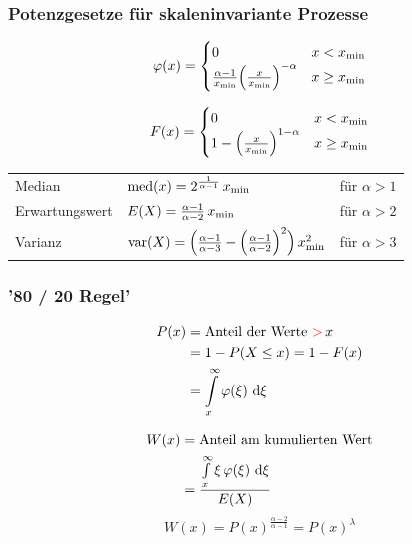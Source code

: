 \subsubsection{Potenzgesetze für skaleninvariante Prozesse}

$$ \varphi(x) = \begin{cases}
0 																			& x < x_{\rm min} 	\\
\frac{\alpha - 1}{x_{\rm min}} \Big( \frac{x}{x_{\rm min}} \Big)^{-\alpha} 	& x \geq x_{\rm min} 
\end{cases}$$ 



$$ F(x) =  \begin{cases}
0 													& x < x_{\rm min} 		\\
1 - \Big( \frac{x}{x_{\rm min}} \Big)^{1 - \alpha} 	& x \geq x_{\rm min} 
\end{cases}$$ 

\vspace{0.2cm}

\renewcommand{\arraystretch}{1.4}
\begin{tabular}{lll}
	Median 			& $ \mathrm{med}(x) = 2^{\frac{1}{\alpha-1}} \, x_{\rm min} $ 	& für $\alpha > 1$ \\
	Erwartungswert 	& $E(X) = \frac{\alpha - 1}{\alpha - 2} \, x_{\rm min}$ 		& für $\alpha > 2$ \\
	Varianz 		& $ \mathrm{var}(X) = \Big( \frac{\alpha - 1}{\alpha - 3} - \Big( \frac{\alpha - 1}{\alpha - 2} \Big)^2 \Big) \, x_{\rm min}^2 $ & für $\alpha > 3$
\end{tabular}
\renewcommand{\arraystretch}{1}


\subsubsection{'80 / 20 Regel'}

\vspace{-0.4cm}

\begin{minipage}[t]{0.48\columnwidth}
	\begin{align*}
		P(x) 	&= \text{Anteil der Werte } {\color{red}>} \, x 			\\
				&= 1 - P(X \leq x) = 1 - F(x) 						\\
				&= \int\limits_x^{\infty} \varphi(\xi) \, \mathop{} \! \mathrm{d} \xi 
	\end{align*}
\end{minipage}
\hfill
\begin{minipage}[t]{0.48\columnwidth}
	\begin{align*}
		W(x) 	&= \text{Anteil am kumulierten Wert} 									\\
				&= \frac{\int\limits_x^{\infty} \xi \, \varphi(\xi) \, \mathop{} \! \mathrm{d} \xi}{E(X)} 
	\end{align*}
	$$ W(x)= P(x)^{\frac{\alpha-2}{\alpha-1}} = P(x)^{\lambda} $$ 
\end{minipage}

